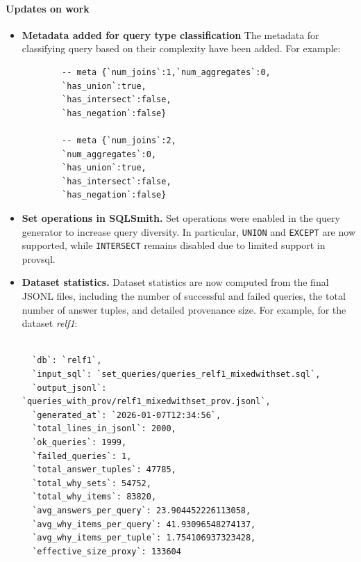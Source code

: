 \documentclass{article}
\begin{document}
\paragraph{Updates on work}
\begin{itemize}
    \item \textbf{Metadata added for query type classification}
    The metadata for classifying query based on their complexity have been added.
    For example:
    \begin{Verbatim}
        -- meta {`num_joins`:1,`num_aggregates`:0,
        `has_union`:true,
        `has_intersect`:false,
        `has_negation`:false}

        -- meta {`num_joins`:2,
        `num_aggregates`:0,
        `has_union`:true,
        `has_intersect`:false,
        `has_negation`:false}

    \end{Verbatim}
    \item \textbf{Set operations in SQLSmith.}  
    Set operations were enabled in the query generator to increase query diversity. In particular, \texttt{UNION} and \texttt{EXCEPT} are now supported, while \texttt{INTERSECT} remains disabled due to limited support in provsql.

    \item \textbf{Dataset statistics.}  
    Dataset statistics are now computed from the final JSONL files, including the number of successful and failed queries, the total number of answer tuples, and detailed provenance size. For example, for the dataset \emph{relf1}:
    \begin{Verbatim}
       
  `db`: `relf1`,
  `input_sql`: `set_queries/queries_relf1_mixedwithset.sql`,
  `output_jsonl`: `queries_with_prov/relf1_mixedwithset_prov.jsonl`,
  `generated_at`: `2026-01-07T12:34:56`,
  `total_lines_in_jsonl`: 2000, 
  `ok_queries`: 1999,
  `failed_queries`: 1,
  `total_answer_tuples`: 47785,
  `total_why_sets`: 54752,
  `total_why_items`: 83820,
  `avg_answers_per_query`: 23.904452226113058,
  `avg_why_items_per_query`: 41.93096548274137,
  `avg_why_items_per_tuple`: 1.754106937323428,
  `effective_size_proxy`: 133604


    \end{Verbatim}


\end{itemize}
\end{document}
